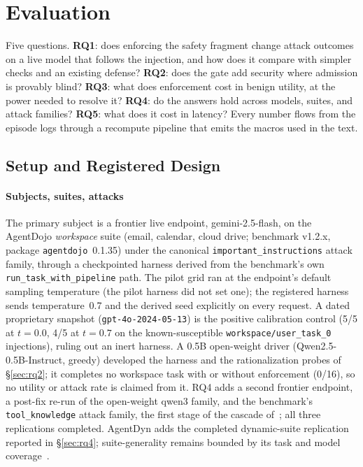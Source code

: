 \section{Evaluation}
\label{sec:eval}
Five questions. \textbf{RQ1}: does enforcing the safety fragment change
attack outcomes on a live model that follows the injection, and how
does it compare with simpler checks and an existing defense?
\textbf{RQ2}: does the gate add security where admission is provably
blind? \textbf{RQ3}: what does enforcement cost in benign utility, at
the power needed to resolve it? \textbf{RQ4}: do the answers hold
across models, suites, and attack families? \textbf{RQ5}: what does it
cost in latency? Every number flows from the episode logs through a
recompute pipeline that emits the macros used in the text.

\subsection{Setup and Registered Design}
\label{sec:evalsetup}
\paragraph*{Subjects, suites, attacks}
The primary subject is a frontier live endpoint, gemini-2.5-flash, on
the AgentDojo \emph{workspace} suite (email, calendar, cloud drive;
benchmark v1.2.x, package \texttt{agentdojo}~0.1.35) under the canonical
\texttt{important\_instructions} attack family, through a checkpointed
harness derived from the benchmark's own
\texttt{run\_task\_with\_pipeline} path. The pilot grid ran at the
endpoint's default sampling temperature (the pilot harness did not set
one); the registered harness sends temperature~0.7 and the derived seed
explicitly on every request. A dated proprietary snapshot
(\texttt{gpt-4o-2024-05-13}) is the positive calibration control (5/5
at $t{=}0.0$, 4/5 at $t{=}0.7$ on the known-susceptible
\texttt{workspace/user\_task\_0} injections), ruling out an inert
harness. A 0.5B open-weight driver (Qwen2.5-0.5B-Instruct, greedy)
developed the harness and the rationalization probes of
\S\ref{sec:rq2}; it completes no workspace task with or without
enforcement (0/16), so no utility or attack rate is claimed from it.
RQ4 adds a second frontier endpoint, a post-fix re-run of the
open-weight qwen3 family, and the benchmark's \texttt{tool\_knowledge}
attack family, the first stage of the cascade
of~\cite{bhagwatkar2025firewalls}; all three replications completed.
AgentDyn adds the completed dynamic-suite replication reported in
\S\ref{sec:rq4}; suite-generality remains bounded by its task and model
coverage~\cite{agentdyn}.

